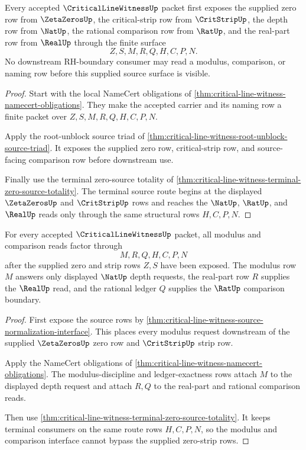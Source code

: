 \begin{theorem}
\label{thm:critical-line-witness-source-normalization-interface}
Every accepted $\CriticalLineWitnessUp$ packet first exposes the supplied zero row from $\ZetaZerosUp$, the critical-strip row from $\CritStripUp$, the depth row from $\NatUp$, the rational comparison row from $\RatUp$, and the real-part row from $\RealUp$ through the finite surface
$$
Z,S,M,R,Q,H,C,P,N.
$$
No downstream RH-boundary consumer may read a modulus, comparison, or naming row before this supplied source surface is visible.
\end{theorem}
\begin{proof}
Start with the local NameCert obligations of \autoref{thm:critical-line-witness-namecert-obligations}. They make the accepted carrier and its naming row a finite packet over $Z,S,M,R,Q,H,C,P,N$.

Apply the root-unblock source triad of \autoref{thm:critical-line-witness-root-unblock-source-triad}. It exposes the supplied zero row, critical-strip row, and source-facing comparison row before downstream use.

Finally use the terminal zero-source totality of \autoref{thm:critical-line-witness-terminal-zero-source-totality}. The terminal source route begins at the displayed $\ZetaZerosUp$ and $\CritStripUp$ rows and reaches the $\NatUp$, $\RatUp$, and $\RealUp$ reads only through the same structural rows $H,C,P,N$.
\end{proof}

\begin{theorem}
\label{thm:critical-line-witness-modulus-ledger-interface}
For every accepted $\CriticalLineWitnessUp$ packet, all modulus and comparison reads factor through
$$
M,R,Q,H,C,P,N
$$
after the supplied zero and strip rows $Z,S$ have been exposed. The modulus row $M$ answers only displayed $\NatUp$ depth requests, the real-part row $R$ supplies the $\RealUp$ read, and the rational ledger $Q$ supplies the $\RatUp$ comparison boundary.
\end{theorem}
\begin{proof}
First expose the source rows by \autoref{thm:critical-line-witness-source-normalization-interface}. This places every modulus request downstream of the supplied $\ZetaZerosUp$ zero row and $\CritStripUp$ strip row.

Apply the NameCert obligations of \autoref{thm:critical-line-witness-namecert-obligations}. The modulus-discipline and ledger-exactness rows attach $M$ to the displayed depth request and attach $R,Q$ to the real-part and rational comparison reads.

Then use \autoref{thm:critical-line-witness-terminal-zero-source-totality}. It keeps terminal consumers on the same route rows $H,C,P,N$, so the modulus and comparison interface cannot bypass the supplied zero-strip rows.
\end{proof}

